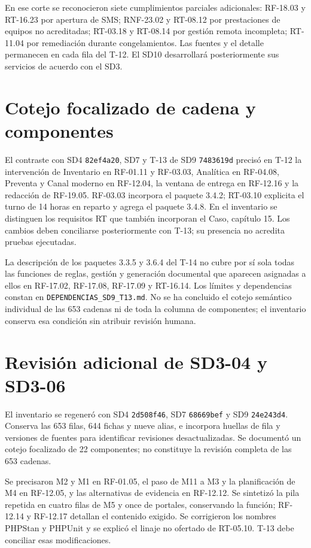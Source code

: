 \documentclass[11pt,letterpaper]{article}
\begin{document}
En ese corte se reconocieron siete cumplimientos parciales adicionales: RF-18.03 y RT-16.23 por apertura de SMS; RNF-23.02 y RT-08.12 por prestaciones de equipos no acreditadas; RT-03.18 y RT-08.14 por gestión remota incompleta; RT-11.04 por remediación durante congelamientos. Las fuentes y el detalle permanecen en cada fila del T-12. El SD10 desarrollará posteriormente sus servicios de acuerdo con el SD3.

\section*{Cotejo focalizado de cadena y componentes}

El contraste con SD4 \texttt{82ef4a20}, SD7 y T-13 de SD9 \texttt{7483619d} precisó en T-12 la intervención de Inventario en RF-01.11 y RF-03.03, Analítica en RF-04.08, Preventa y Canal moderno en RF-12.04, la ventana de entrega en RF-12.16 y la redacción de RF-19.05. RF-03.03 incorpora el paquete 3.4.2; RT-03.10 explicita el turno de 14 horas en reparto y agrega el paquete 3.4.8. En el inventario se distinguen los requisitos RT que también incorporan el Caso, capítulo 15. Los cambios deben conciliarse posteriormente con T-13; su presencia no acredita pruebas ejecutadas.

La descripción de los paquetes 3.3.5 y 3.6.4 del T-14 no cubre por sí sola todas las funciones de reglas, gestión y generación documental que aparecen asignadas a ellos en RF-17.02, RF-17.08, RF-17.09 y RT-16.14. Los límites y dependencias constan en \texttt{DEPENDENCIAS\_SD9\_T13.md}. No se ha concluido el cotejo semántico individual de las 653 cadenas ni de toda la columna de componentes; el inventario conserva esa condición sin atribuir revisión humana.

\section*{Revisión adicional de SD3-04 y SD3-06}

El inventario se regeneró con SD4 \texttt{2d508f46}, SD7 \texttt{68669bef} y SD9 \texttt{24e243d4}. Conserva las 653 filas, 644 fichas y nueve alias, e incorpora huellas de fila y versiones de fuentes para identificar revisiones desactualizadas. Se documentó un cotejo focalizado de 22 componentes; no constituye la revisión completa de las 653 cadenas.

Se precisaron M2 y M1 en RF-01.05, el paso de M11 a M3 y la planificación de M4 en RF-12.05, y las alternativas de evidencia en RF-12.12. Se sintetizó la pila repetida en cuatro filas de M5 y once de portales, conservando la función; RF-12.14 y RF-12.17 detallan el contenido exigido. Se corrigieron los nombres PHPStan y PHPUnit y se explicó el linaje no ofertado de RT-05.10. T-13 debe conciliar esas modificaciones.
\end{document}
